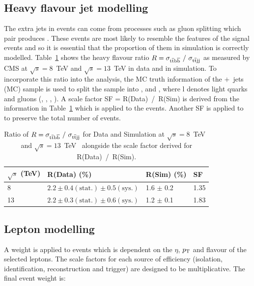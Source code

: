 \subsection{Heavy flavour jet modelling ~\label{ttbbmod}}
The extra jets in \ttbar events can come from processes such as gluon splitting which pair produces \bbbar. These \ttbb events are most likely to resemble the features of the \tttt signal events and so it is essential that the proportion of them in simulation is correctly modelled. Table~\ref{tab:heavyflavR} shows the heavy flavour ratio $R= \sigma_{\mathrm{t}\overline{\mathrm{t}}\mathrm{b}\overline{\mathrm{b}}}~/~ \sigma_{\mathrm{t}\overline{\mathrm{t}} \textrm{jj} }$ as measured by CMS at $\sqrt{s}=8$~TeV and $\sqrt{s}=13$~TeV in data and in simulation. To incorporate this ratio into the analysis, the MC truth information of the \ttbar$+$~jets (MC) sample is used to split the sample into \ttbb, \ttcc and \ttll, where l denotes light quarks and gluons (\cPqu, \cPqd, \cPqs, \cPg).  A scale factor SF = R(Data)~/~R(Sim) is derived from the information in Table~\ref{tab:heavyflavR} which is applied to the \ttbb events. Another SF is applied to \ttll to preserve the total number of \ttbar events.


\begin{table}[htpb!]
\footnotesize
\begin{center}
\begin{tabular}{|l|l|l|l|}
\hline
$\sqrt{s}$ (TeV)                         & R(Data)  (\%)                                                                             & R(Sim) (\%)       & SF   \\
\hline
8  & $2.2 \pm 0.4 \left( \textrm{stat.} \right) \pm 0.5 \left(\textrm{sys.} \right)$ & 1.6 $\pm$ 0.2 & 1.35 \\
13 & $2.2 \pm 0.3 \left( \textrm{stat.} \right) \pm 0.6 \left(\textrm{sys.} \right)$ & 1.2 $\pm$ 0.1 & 1.83 \\
\hline
\end{tabular}
\caption{Ratio of $R= \sigma_{\mathrm{t}\overline{\mathrm{t}}\mathrm{b}\overline{\mathrm{b}}}~/~ \sigma_{\mathrm{t}\overline{\mathrm{t}} \textrm{jj} }$ for Data and Simulation at $\sqrt{s}=8$~TeV~\cite{Khachatryan2015132} and $\sqrt{s}=13$~TeV~\cite{CMS-PAS-TOP-16-010} alongside the scale factor derived for R(Data)~/~R(Sim).}
\label{tab:heavyflavR}
\end{center}
\end{table}

\subsection{Lepton modelling}
A weight is applied to events which is dependent on the $\eta$, $p_{\mathrm{T}}$ and flavour of the selected leptons. The scale factors for each source of efficiency (isolation, identification, reconstruction and trigger) are designed to be multiplicative. The final event weight is:

